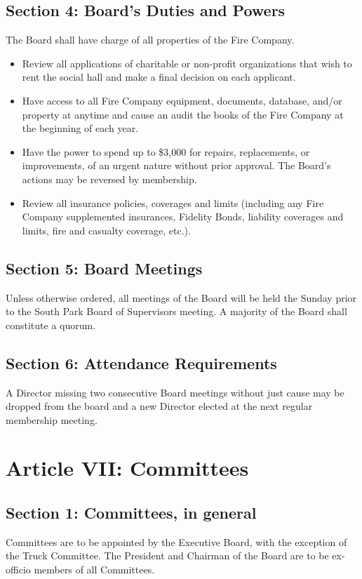 ﻿\documentclass[12pt,letterpaper]{article}
\begin{document}
\subsection*{Section 4: Board's Duties and Powers}
The Board shall have charge of all properties of the Fire Company.
\begin{itemize}
\item Review all applications of charitable or non-profit organizations that wish to rent the social hall and make a final decision on each applicant. 
\item Have access to all Fire Company equipment, documents, database, and/or property at anytime and cause an audit the books of the Fire Company at the beginning of each year. 
\item Have the power to spend up to \$3,000 for repairs, replacements, or improvements, of an urgent nature without prior approval.  The Board’s actions may be reversed by membership.
\item Review all insurance policies, coverages and limits (including any Fire Company supplemented insurances, Fidelity Bonds, liability coverages and limits, fire and casualty coverage, etc.). 
\end{itemize}

\subsection*{Section 5: Board Meetings}
Unless otherwise ordered, all meetings of the Board will be held the Sunday prior to the South Park Board of Supervisors meeting.  A majority of the Board shall constitute a quorum. 

\subsection*{Section 6: Attendance Requirements}
A Director missing two consecutive Board meetings without just cause may be dropped from the board and a new Director elected at the next regular membership meeting.  

\section*{Article VII: Committees}

\subsection*{Section 1: Committees, in general}
Committees are to be appointed by the Executive Board, with the exception of the Truck Committee.  The President and Chairman of the Board are to be ex-officio members of all Committees.
\end{document}
